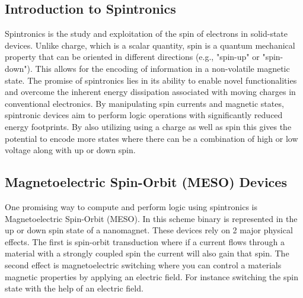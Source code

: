 \documentclass[sigconf]{acmart}
\begin{document}
\subsection{Introduction to Spintronics}
Spintronics is the study and exploitation of the spin 
of electrons in solid-state devices. Unlike charge, which is a 
scalar quantity, spin is a quantum mechanical property that can 
be oriented in different directions (e.g., "spin-up" or "spin-down").
This allows for the encoding of information in a non-volatile magnetic
state. The promise of spintronics lies in its ability to enable 
novel functionalities and overcome the inherent energy dissipation 
associated with moving charges in conventional electronics. By manipulating 
spin currents and magnetic states, spintronic devices aim to perform logic 
operations with significantly reduced energy footprints. 
By also utilizing using a charge as well as spin this gives the potential to encode more 
states where there can be a combination of high or low voltage along 
with up or down spin. 


\subsection{Magnetoelectric Spin-Orbit (MESO) Devices} 
One promising way to compute and perform logic using spintronics is 
Magnetoelectric Spin-Orbit (MESO). In this scheme binary is represented 
in the up or down spin state of a nanomagnet. These devices rely 
on 2 major physical effects. The first is spin-orbit transduction where 
if a current flows through a material with a strongly coupled spin 
the current will also gain that spin. The second effect is magnetoelectric 
switching where you can control a materials magnetic properties by applying 
an electric field. For instance switching the spin state with the help of 
an electric field.
\end{document}
